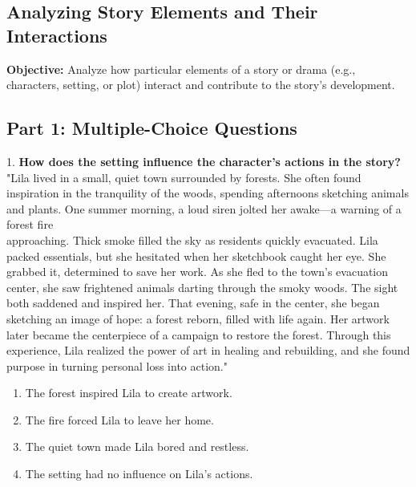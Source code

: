 \documentclass[12pt]{article}
\begin{document}
\subsection*{Analyzing Story Elements and Their Interactions}
\onehalfspacing

\begin{tcolorbox}[colframe=black!40, colback=gray!0, title=Learning Objective]
\textbf{Objective:} Analyze how particular elements of a story or drama (e.g., characters, setting, or plot) interact and contribute to the story's development.
\end{tcolorbox}

\subsection*{Part 1: Multiple-Choice Questions}

1. \textbf{How does the setting influence the character’s actions in the story?\\}
"Lila lived in a small, quiet town surrounded by forests. She often found inspiration in the tranquility of the woods, spending afternoons sketching animals and plants. One summer morning, a loud siren jolted her awake—a warning of a forest fire \\approaching. Thick smoke filled the sky as residents quickly evacuated. Lila packed essentials, but she hesitated when her sketchbook caught her eye. She grabbed it, determined to save her work. As she fled to the town’s evacuation center, she saw frightened animals darting through the smoky woods. The sight both saddened and inspired her. That evening, safe in the center, she began sketching an image of hope: a forest reborn, filled with life again. Her artwork later became the centerpiece of a campaign to restore the forest. Through this experience, Lila realized the power of art in healing and rebuilding, and she found purpose in turning personal loss into action."  
\begin{enumerate}[label=\Alph*.]
    \item The forest inspired Lila to create artwork.  
    \item The fire forced Lila to leave her home.  
    \item The quiet town made Lila bored and restless.  
    \item The setting had no influence on Lila’s actions.  
\end{enumerate}
\end{document}
